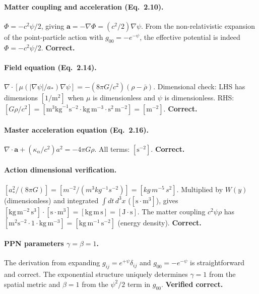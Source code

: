 \documentclass[12pt,a4paper]{article}
\begin{document}
\paragraph{Matter coupling and acceleration (Eq.~2.10).}
$\Phi = -c^2\psi/2$, giving $\mathbf{a} = -\nabla\Phi = (c^2/2)\nabla\psi$.
From the non-relativistic expansion of the point-particle action with
$g_{00} = -e^{-\psi}$, the effective potential is indeed $\Phi = -c^2\psi/2$.
\textbf{Correct.}

\paragraph{Field equation (Eq.~2.14).}
$\nabla\cdot[\mu(|\nabla\psi|/a_*)\nabla\psi] = -(8\pi G/c^2)(\rho - \bar{\rho})$.
Dimensional check: LHS has dimensions $[1/\text{m}^2]$ when $\mu$ is
dimensionless and $\psi$ is dimensionless. RHS: $[G\rho/c^2] =
[\text{m}^3\text{kg}^{-1}\text{s}^{-2} \cdot \text{kg}\,\text{m}^{-3}
\cdot \text{s}^2\,\text{m}^{-2}] = [\text{m}^{-2}]$. \textbf{Correct.}

\paragraph{Master acceleration equation (Eq.~2.16).}
$\nabla\cdot\mathbf{a} + (\kappa_\alpha/c^2)a^2 = -4\pi G\rho$.
All terms: $[\text{s}^{-2}]$. \textbf{Correct.}

\paragraph{Action dimensional verification.}
$[a_*^2/(8\pi G)] = [m^{-2}/(m^3 kg^{-1} s^{-2})] = [kg\,m^{-5}\,s^{2}]$.
Multiplied by $W(y)$ (dimensionless) and integrated $\int dt\,d^3x$
($[\text{s}\cdot\text{m}^3]$), gives $[\text{kg}\,\text{m}^{-2}\,\text{s}^3]
\cdot [\text{s}\cdot\text{m}^3] = [\text{kg}\,\text{m}\,\text{s}]
= [\text{J}\cdot\text{s}]$. The matter coupling $c^2\psi\rho$ has
$[\text{m}^2\text{s}^{-2}\cdot 1\cdot\text{kg}\,\text{m}^{-3}]
= [\text{kg}\,\text{m}^{-1}\,\text{s}^{-2}]$ (energy density).
\textbf{Correct.}

\paragraph{PPN parameters $\gamma = \beta = 1$.}
The derivation from expanding $g_{ij} = e^{+\psi}\delta_{ij}$ and
$g_{00} = -e^{-\psi}$ is straightforward and correct. The exponential
structure uniquely determines $\gamma = 1$ from the spatial metric and
$\beta = 1$ from the $\psi^2/2$ term in $g_{00}$.
\textbf{Verified correct.}
\end{document}
